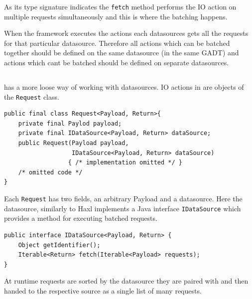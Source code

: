 As its type signature indicates the \texttt{fetch} method performs the IO action on multiple requests simultaneously and this is where the batching happens.

When the framework executes the actions each datasources gets all the requests for that particular datasource. Therefore all actions which can be batched together should be defined on the same datasource (in the same GADT) and actions which cant be batched should be defined on separate datasources.

\subsection{\yauhau{}}

\yauhau{} has a more loose way of working with datasources.
IO actions in \yauhau{} are objects of the \texttt{Request} class.

\begin{verbatim}
public final class Request<Payload, Return>{
    private final Paylod payload;
    private final IDataSource<Payload, Return> dataSource;
    public Request(Payload payload, 
                   IDataSource<Payload, Return> dataSource) 
                  { /* implementation omitted */ }
    /* omitted code */
}
\end{verbatim}

Each \texttt{Request} has two fields, an arbitrary Payload and a datasource.
Here the datasource, similarly to Haxl implements a Java interface \texttt{IDataSource} which provides a method for executing batched requests.

\begin{verbatim}
public interface IDataSource<Payload, Return> {
    Object getIdentifier();
    Iterable<Return> fetch(Iterable<Payload> requests);
}
\end{verbatim}

At runtime requests are sorted by the datasource they are paired with and then handed to the respective source as a single list of many requests.


















